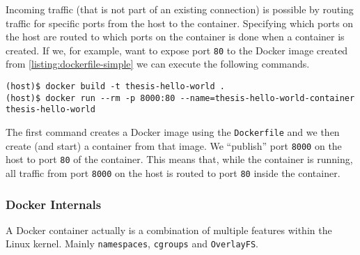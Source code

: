 \hfill

Incoming traffic (that is not part of an existing connection) is possible by routing traffic for specific ports from the host to the container.
Specifying which ports on the host are routed to which ports on the container is done when a container is created. If we, for example, want to expose port \lstinline{80} to the Docker image created from \autoref{listing:dockerfile-simple} we can execute the following commands.

\begin{lstlisting}[caption={Creating a Docker container with exposed port.},label={listing:docker-port},captionpos=b]
(host)$ docker build -t thesis-hello-world .
(host)$ docker run --rm -p 8000:80 --name=thesis-hello-world-container thesis-hello-world
\end{lstlisting}

The first command creates a Docker image using the \lstinline{Dockerfile} and we then create (and start) a container from that image. We ``publish'' port \lstinline{8000} on the host to port \lstinline{80} of the container. This means that, while the container is running, all traffic from port \lstinline{8000} on the host is routed to port \lstinline{80} inside the container.

\subsubsection{Docker Internals}
A Docker container actually is a combination of multiple features within the Linux kernel.
Mainly \lstinline{namespaces}, \lstinline{cgroups} and \lstinline{OverlayFS}.

\hfill

